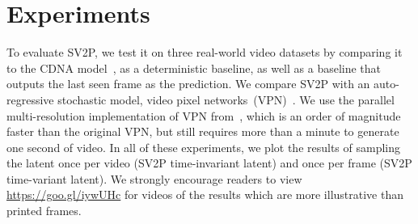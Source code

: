 \documentclass{article} \usepackage{iclr2018_conference,times}
\begin{document}
 
\section{Experiments}
To evaluate SV2P, we test it on three real-world video datasets by comparing it to the CDNA model~\citep{finn2016unsupervised}, as a deterministic baseline, as well as a baseline that outputs the last seen frame as the prediction.
We compare SV2P with an auto-regressive stochastic model, video pixel networks~(VPN)~\citep{kalchbrenner2016video}. We use the parallel multi-resolution implementation of VPN from~\cite{reed2017parallel}, which is an order of magnitude faster than the original VPN, but still requires more than a minute to generate one second of  video. In all of these experiments, we plot the results of sampling the latent once per video (SV2P time-invariant latent) and once per frame (SV2P time-variant latent). We strongly encourage readers to view \url{https://goo.gl/iywUHc} for videos of the  results which are more illustrative than printed frames.
\end{document}
